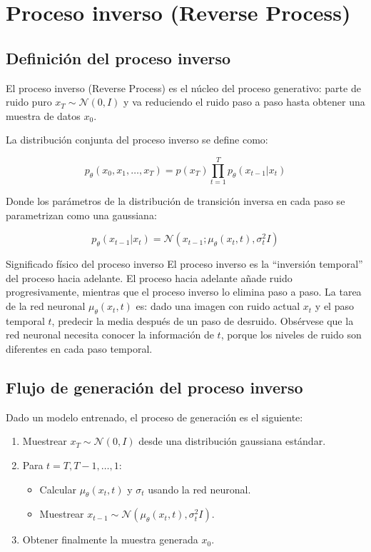 \section{Proceso inverso (Reverse Process)}

\subsection{Definición del proceso inverso}

El proceso inverso (Reverse Process) es el núcleo del proceso generativo: parte de ruido puro $x_T \sim \mathcal{N}(0, I)$ y va reduciendo el ruido paso a paso hasta obtener una muestra de datos $x_0$.

La distribución conjunta del proceso inverso se define como:

$$p_\theta(x_0, x_1, \ldots, x_T) = p(x_T) \prod_{t=1}^{T} p_\theta(x_{t-1} | x_t)$$

Donde los parámetros de la distribución de transición inversa en cada paso se parametrizan como una gaussiana:

$$p_\theta(x_{t-1} | x_t) = \mathcal{N}(x_{t-1}; \mu_\theta(x_t, t), \sigma_t^2 I)$$

\begin{importantbox}{Significado físico del proceso inverso}
El proceso inverso es la ``inversión temporal'' del proceso hacia adelante. El proceso hacia adelante añade ruido progresivamente, mientras que el proceso inverso lo elimina paso a paso. La tarea de la red neuronal $\mu_\theta(x_t, t)$ es: dado una imagen con ruido actual $x_t$ y el paso temporal $t$, predecir la media después de un paso de desruido. Obsérvese que la red neuronal necesita conocer la información de $t$, porque los niveles de ruido son diferentes en cada paso temporal.
\end{importantbox}

\subsection{Flujo de generación del proceso inverso}

Dado un modelo entrenado, el proceso de generación es el siguiente:

\begin{enumerate}
    \item Muestrear $x_T \sim \mathcal{N}(0, I)$ desde una distribución gaussiana estándar.
    \item Para $t = T, T-1, \ldots, 1$:
    \begin{itemize}
        \item Calcular $\mu_\theta(x_t, t)$ y $\sigma_t$ usando la red neuronal.
        \item Muestrear $x_{t-1} \sim \mathcal{N}(\mu_\theta(x_t, t), \sigma_t^2 I)$.
    \end{itemize}
    \item Obtener finalmente la muestra generada $x_0$.
\end{enumerate}

